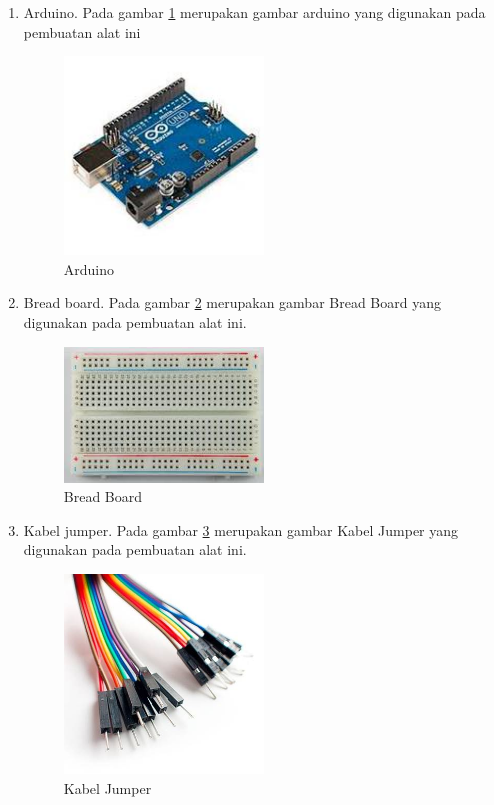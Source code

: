 \begin{enumerate}
\item Arduino. Pada gambar \ref{labelgambar1} merupakan gambar arduino yang digunakan pada pembuatan alat ini
	\begin{figure}[htbp]
	\centering
	\includegraphics[width=0.5\textwidth]{figures/ALAT_PENDETEKSI_BANJIR/arduino1c}
	\caption{Arduino}
	\label{labelgambar1}
	\end{figure}

\item Bread board. Pada gambar \ref{labelgambar2} merupakan gambar Bread Board yang digunakan pada pembuatan alat ini.
	\begin{figure}[htbp]
	\centering
	\includegraphics[width=0.5\textwidth]{figures/ALAT_PENDETEKSI_BANJIR/bread_board_1c}
	\caption{Bread Board}
	\label{labelgambar2}
	\end{figure}

\item Kabel jumper. Pada gambar \ref{labelgambar3} merupakan gambar Kabel Jumper yang digunakan pada pembuatan alat ini.
	\begin{figure}[htbp]
	\centering
	\includegraphics[width=0.5\textwidth]{figures/ALAT_PENDETEKSI_BANJIR/kabel_jumper_1c}
	\caption{Kabel Jumper}
	\label{labelgambar3}
	\end{figure}


\end{enumerate}
